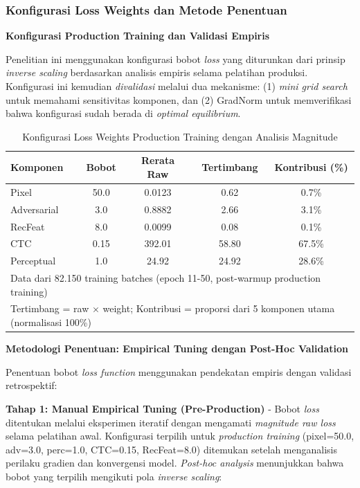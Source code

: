 \documentclass[12pt,a4paper]{article}
\begin{document}
\vspace{0.8em}

\subsubsection{Konfigurasi Loss Weights dan Metode Penentuan}
\label{subsubsec:optimasi-loss-weights}

\textbf{Konfigurasi Production Training dan Validasi Empiris}

Penelitian ini menggunakan konfigurasi bobot \textit{loss} yang diturunkan dari prinsip \textit{inverse scaling} berdasarkan analisis empiris selama pelatihan produksi. Konfigurasi ini kemudian \textit{divalidasi} melalui dua mekanisme: (1) \textit{mini grid search} untuk memahami sensitivitas komponen, dan (2) GradNorm untuk memverifikasi bahwa konfigurasi sudah berada di \textit{optimal equilibrium}.

\begin{table}[H]
\centering
\caption{Konfigurasi Loss Weights Production Training dengan Analisis Magnitude}
\label{tab:final-loss-weights}
\label{tab:loss-weights-config}
\footnotesize
\begin{tabular}{lcccc}
\hline
\textbf{Komponen} & \textbf{Bobot} & \textbf{Rerata Raw} & \textbf{Tertimbang} & \textbf{Kontribusi (\%)} \\
\hline
Pixel & 50.0 & 0.0123 & 0.62 & 0.7\% \\
Adversarial & 3.0 & 0.8882 & 2.66 & 3.1\% \\
RecFeat & 8.0 & 0.0099 & 0.08 & 0.1\% \\
CTC & 0.15 & 392.01 & 58.80 & 67.5\% \\
Perceptual & 1.0 & 24.92 & 24.92 & 28.6\% \\
\hline
\multicolumn{5}{l}{\footnotesize Data dari 82.150 training batches (epoch 11-50, post-warmup production training)} \\
\multicolumn{5}{l}{\footnotesize Tertimbang = raw $\times$ weight; Kontribusi = proporsi dari 5 komponen utama (normalisasi 100\%)} \\
\end{tabular}
\end{table}

\textbf{Metodologi Penentuan: Empirical Tuning dengan Post-Hoc Validation}

Penentuan bobot \textit{loss function} menggunakan pendekatan empiris dengan validasi retrospektif:

\textbf{Tahap 1: Manual Empirical Tuning (Pre-Production)} - Bobot \textit{loss} ditentukan melalui eksperimen iteratif dengan mengamati \textit{magnitude raw loss} selama pelatihan awal. Konfigurasi terpilih untuk \textit{production training} (pixel=50.0, adv=3.0, perc=1.0, CTC=0.15, RecFeat=8.0) ditemukan setelah menganalisis perilaku gradien dan konvergensi model. \textit{Post-hoc analysis} menunjukkan bahwa bobot yang terpilih mengikuti pola \textit{inverse scaling}:
\end{document}
